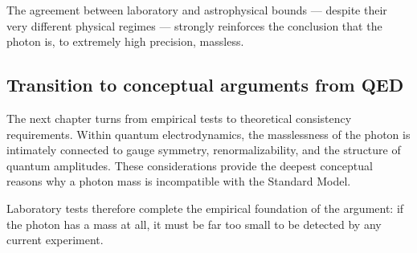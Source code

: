 The agreement between laboratory and astrophysical bounds — despite their 
very different physical regimes — strongly reinforces the conclusion that 
the photon is, to extremely high precision, massless.

\subsection*{Transition to conceptual arguments from QED}

The next chapter turns from empirical tests to theoretical consistency 
requirements. Within quantum electrodynamics, the masslessness of the 
photon is intimately connected to gauge symmetry, renormalizability, and 
the structure of quantum amplitudes. These considerations provide the 
deepest conceptual reasons why a photon mass is incompatible with the 
Standard Model.

Laboratory tests therefore complete the empirical foundation of the 
argument: if the photon has a mass at all, it must be far too small to be 
detected by any current experiment.
